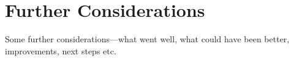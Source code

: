 
\part{Further Considerations}
\label{prt:further_considerations}


Some further considerations---what went well, what could have been better,
improvements, next steps etc.



